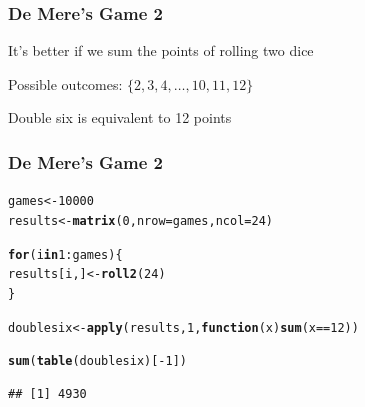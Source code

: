 \documentclass[12pt]{beamer}\usepackage[]{graphicx}\usepackage[]{color}
\makeatletter
\newcommand{\hlnum}[1]{\textcolor[rgb]{0.686,0.059,0.569}{#1}}%
\newcommand{\hlopt}[1]{\textcolor[rgb]{0,0,0}{#1}}%
\newcommand{\hlstd}[1]{\textcolor[rgb]{0.345,0.345,0.345}{#1}}%
\newcommand{\hlkwa}[1]{\textcolor[rgb]{0.161,0.373,0.58}{\textbf{#1}}}%
\newcommand{\hlkwb}[1]{\textcolor[rgb]{0.69,0.353,0.396}{#1}}%
\newcommand{\hlkwc}[1]{\textcolor[rgb]{0.333,0.667,0.333}{#1}}%
\newcommand{\hlkwd}[1]{\textcolor[rgb]{0.737,0.353,0.396}{\textbf{#1}}}%
\newenvironment{kframe}{%
 \def\at@end@of@kframe{}%
 \ifinner\ifhmode%
  \def\at@end@of@kframe{\end{minipage}}%
  \begin{minipage}{\columnwidth}%
 \fi\fi%
 \def\FrameCommand##1{\hskip\@totalleftmargin \hskip-\fboxsep
 \colorbox{shadecolor}{##1}\hskip-\fboxsep
     \hskip-\linewidth \hskip-\@totalleftmargin \hskip\columnwidth}%
 \MakeFramed {\advance\hsize-\width
   \@totalleftmargin\z@ \linewidth\hsize
   \@setminipage}}%
 {\par\unskip\endMakeFramed%
 \at@end@of@kframe}
\newenvironment{knitrout}{}{} %
\makeatother
\begin{document}

\begin{frame}[fragile]
\frametitle{De Mere's Game 2}

\bbi
  \item It's better if we sum the points of rolling two dice
  \item Possible outcomes: $\{2, 3, 4, \dots, 10, 11, 12\}$
  \item Double six is equivalent to 12 points
\ei
\eb

\end{frame}


\begin{frame}[fragile]
\frametitle{De Mere's Game 2}

\begin{knitrout}\footnotesize
{}\color{fgcolor}\begin{kframe}
\begin{alltt}
\hlstd{games} \hlkwb{<-} \hlnum{10000}
\hlstd{results} \hlkwb{<-} \hlkwd{matrix}\hlstd{(}\hlnum{0}\hlstd{,} \hlkwc{nrow} \hlstd{= games,} \hlkwc{ncol} \hlstd{=} \hlnum{24}\hlstd{)}

\hlkwa{for} \hlstd{(i} \hlkwa{in} \hlnum{1}\hlopt{:}\hlstd{games) \{}
  \hlstd{results[i, ]} \hlkwb{<-} \hlkwd{roll2}\hlstd{(}\hlnum{24}\hlstd{)}
\hlstd{\}}

\hlstd{doublesix} \hlkwb{<-} \hlkwd{apply}\hlstd{(results,} \hlnum{1}\hlstd{,} \hlkwa{function}\hlstd{(}\hlkwc{x}\hlstd{)} \hlkwd{sum}\hlstd{(x} \hlopt{==} \hlnum{12}\hlstd{))}

\hlkwd{sum}\hlstd{(}\hlkwd{table}\hlstd{(doublesix)[}\hlopt{-}\hlnum{1}\hlstd{])}
\end{alltt}
\begin{verbatim}
## [1] 4930
\end{verbatim}
\end{kframe}
\end{knitrout}

\end{frame}

\end{document}
